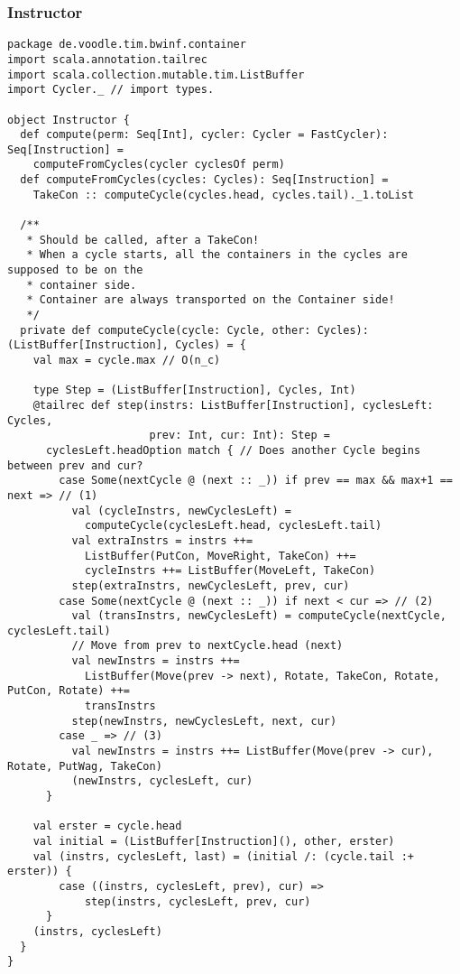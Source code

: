 \subsubsection{Instructor}
\begin{lstlisting}
package de.voodle.tim.bwinf.container
import scala.annotation.tailrec
import scala.collection.mutable.tim.ListBuffer
import Cycler._ // import types.

object Instructor {
  def compute(perm: Seq[Int], cycler: Cycler = FastCycler): Seq[Instruction] =
    computeFromCycles(cycler cyclesOf perm)
  def computeFromCycles(cycles: Cycles): Seq[Instruction] =
    TakeCon :: computeCycle(cycles.head, cycles.tail)._1.toList

  /**
   * Should be called, after a TakeCon!
   * When a cycle starts, all the containers in the cycles are supposed to be on the
   * container side.
   * Container are always transported on the Container side!
   */
  private def computeCycle(cycle: Cycle, other: Cycles): (ListBuffer[Instruction], Cycles) = {
    val max = cycle.max // O(n_c)

    type Step = (ListBuffer[Instruction], Cycles, Int)
    @tailrec def step(instrs: ListBuffer[Instruction], cyclesLeft: Cycles,
                      prev: Int, cur: Int): Step =
      cyclesLeft.headOption match { // Does another Cycle begins between prev and cur?
        case Some(nextCycle @ (next :: _)) if prev == max && max+1 == next => // (1)
          val (cycleInstrs, newCyclesLeft) =
            computeCycle(cyclesLeft.head, cyclesLeft.tail)
          val extraInstrs = instrs ++=
            ListBuffer(PutCon, MoveRight, TakeCon) ++=
            cycleInstrs ++= ListBuffer(MoveLeft, TakeCon)
          step(extraInstrs, newCyclesLeft, prev, cur)
        case Some(nextCycle @ (next :: _)) if next < cur => // (2)
          val (transInstrs, newCyclesLeft) = computeCycle(nextCycle, cyclesLeft.tail)
          // Move from prev to nextCycle.head (next)
          val newInstrs = instrs ++=
            ListBuffer(Move(prev -> next), Rotate, TakeCon, Rotate, PutCon, Rotate) ++=
            transInstrs
          step(newInstrs, newCyclesLeft, next, cur)
        case _ => // (3)
          val newInstrs = instrs ++= ListBuffer(Move(prev -> cur), Rotate, PutWag, TakeCon)
          (newInstrs, cyclesLeft, cur)
      }

    val erster = cycle.head
    val initial = (ListBuffer[Instruction](), other, erster)
    val (instrs, cyclesLeft, last) = (initial /: (cycle.tail :+ erster)) {
        case ((instrs, cyclesLeft, prev), cur) =>
            step(instrs, cyclesLeft, prev, cur)
      }
    (instrs, cyclesLeft)
  }
}
\end{lstlisting}
\newpage
